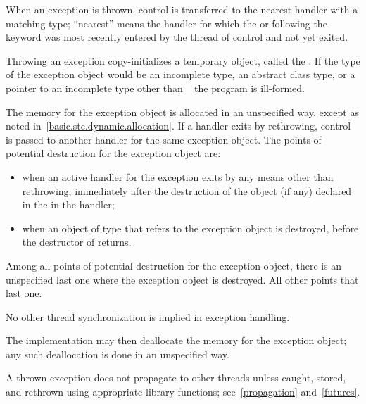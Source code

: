 \pnum
{}%
%
%
When an exception is thrown, control is transferred to the nearest handler with
a matching type; ``nearest'' means the handler
for which the
 or
following the
keyword was most recently entered by the thread of control and not yet exited.

\pnum
Throwing an exception
copy-initializes a temporary object,
called the
.
If the type of the exception object would be
an incomplete type,
an abstract class type,
or a pointer to an incomplete type other than \cv{}~
the program is ill-formed.

\pnum
{}%
%
%
The memory for the exception object is
allocated in an unspecified way, except as noted in~\ref{basic.stc.dynamic.allocation}.
If a handler exits by rethrowing, control is passed to another handler for
the same exception object.
The points of potential destruction for the exception object are:
\begin{itemize}
\item
when an active handler for the exception exits by
any means other than
rethrowing,
immediately after the destruction of the object (if any)
declared in the  in the handler;

\item
when an object of type 
that refers to the exception object is destroyed,
before the destructor of  returns.
\end{itemize}

Among all points of potential destruction for the exception object,
there is an unspecified last one
where the exception object is destroyed.
All other points  that last one.
\begin{note}
No other thread synchronization is implied in exception handling.
\end{note}
The implementation may then
deallocate the memory for the exception object; any such deallocation
is done in an unspecified way.
\begin{note}
A thrown exception does not
propagate to other threads unless caught, stored, and rethrown using
appropriate library functions; see~\ref{propagation} and~\ref{futures}.
\end{note}

